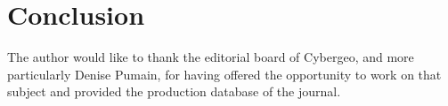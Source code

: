 \section{Conclusion}
\label{sec:discussion}













\begin{acknowledgements}
The author would like to thank the editorial board of Cybergeo, and more particularly Denise Pumain, for having offered the opportunity to work on that subject and provided the production database of the journal. 
\end{acknowledgements}






















